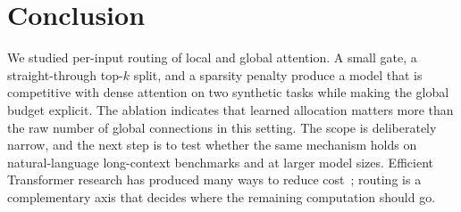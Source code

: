 \documentclass[10pt]{article}
\begin{document}
\section{Conclusion}
\label{sec:conclusion}
We studied per-input routing of local and global attention. A small gate, a straight-through top-$k$ split, and a sparsity penalty produce a model that is competitive with dense attention on two synthetic tasks while making the global budget explicit. The ablation indicates that learned allocation matters more than the raw number of global connections in this setting. The scope is deliberately narrow, and the next step is to test whether the same mechanism holds on natural-language long-context benchmarks and at larger model sizes. Efficient Transformer research has produced many ways to reduce cost~\cite{Tay2022Efficient}; routing is a complementary axis that decides where the remaining computation should go.



\end{document}
